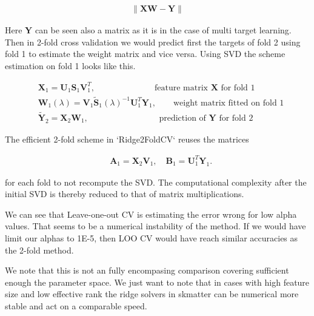 \begin{align}
  \|\mathbf{X}\mathbf{W} - \mathbf{Y}\|
\end{align}
 
Here $\mathbf{Y}$ can be seen also a matrix as it is in the case of
multi target learning. Then in 2-fold cross validation we would predict first
the targets of fold 2 using fold 1 to estimate the weight matrix and vice
versa. Using SVD the scheme estimation on fold 1 looks like this.
                                                                                      
\begin{align}
    &\mathbf{X}_1 = \mathbf{U}_1\mathbf{S}_1\mathbf{V}_1^T,
          \qquad\qquad\qquad\quad
          \textrm{feature matrix }\mathbf{X}\textrm{ for fold 1} \\
    &\mathbf{W}_1(\lambda) = \mathbf{V}_1
           \tilde{\mathbf{S}}_1(\lambda)^{-1} \mathbf{U}_1^T \mathbf{Y}_1,
           \qquad
           \textrm{weight matrix fitted on fold 1}\\
    &\tilde{\mathbf{Y}}_2 = \mathbf{X}_2 \mathbf{W}_1,
           \qquad\qquad\qquad\qquad
           \textrm{ prediction of }\mathbf{Y}\textrm{ for fold 2}
\end{align}

The efficient 2-fold scheme in `Ridge2FoldCV` reuses the matrices
                                                                                      
\begin{align}
    &\mathbf{A}_1 = \mathbf{X}_2 \mathbf{V}_1, \quad
     \mathbf{B}_1 = \mathbf{U}_1^T \mathbf{Y}_1.
\end{align}
                                                                                      
for each fold to not recompute the SVD. The computational complexity
after the initial SVD is thereby reduced to that of matrix multiplications.

We can see that Leave-one-out CV is estimating the error wrong for low
alpha values. That seems to be a numerical instability of the method. If we
would have limit our alphas to 1E-5, then LOO CV would have reach similar
accuracies as the 2-fold method.

We note that this is not an fully encompasing comparison
covering sufficient enough the parameter space. We just want to note that in
cases with high feature size and low effective rank the ridge solvers in
skmatter can be numerical more stable and act on a comparable speed.
                                                                              

